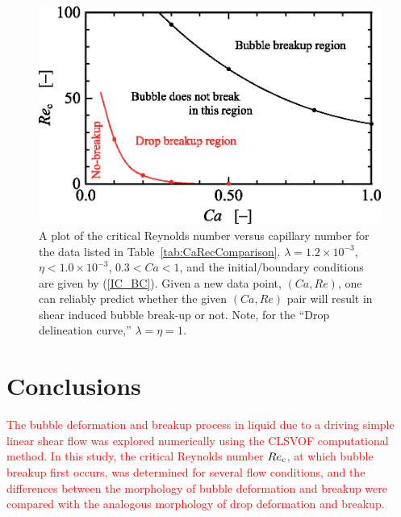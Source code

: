 \documentclass{elsarticle}
\begin{document}
\begin{figure}%
  \centering
  \includegraphics[scale=0.6]{Figure/12-CaRecFit}
  \caption{A plot of the critical Reynolds number versus capillary number
	for the data listed in Table~\ref{tab:CaRecComparison}.  
	$\lambda = 1.2 \times 10^{-3}$, 
	$\eta < 1.0 \times 10^{-3}$, $0.3<Ca<1$, and
        the initial/boundary conditions are given by (\ref{IC_BC}).
	Given a new data point, $(Ca,Re)$, one
	can reliably predict whether the 
	given $(Ca,Re)$ pair will result in shear
	induced bubble break-up or not.  Note, for the ``Drop delineation
	curve,'' $\lambda=\eta=1$.
	   }
  \label{fig:CaRecFit}
\end{figure}
%

\section{Conclusions}
\textcolor{red}{
The bubble deformation and breakup process in liquid due to a driving simple linear shear flow was explored numerically using the CLSVOF computational method.  In this study, the critical Reynolds number $Re_{\rm c}$, at which bubble breakup first occurs, was determined for several flow conditions, and the differences between the morphology of bubble deformation and breakup were compared with the analogous morphology of drop deformation and breakup.
}
\end{document}
